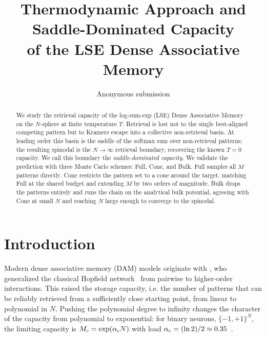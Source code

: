 \documentclass[letterpaper]{article} %
\title{\bfseries Thermodynamic Approach and Saddle-Dominated Capacity
\\of the LSE Dense Associative Memory}
\author{Anonymous submission}
\begin{document}
\maketitle

\begin{abstract}
We study the retrieval capacity of the log-sum-exp (LSE) Dense Associative Memory on the $N$-sphere at finite temperature $T$. Retrieval is lost not to the single best-aligned competing pattern but to Kramers escape into a collective non-retrieval basin. At leading order this basin is the saddle of the softmax sum over non-retrieval patterns; the resulting spinodal is the $N \to \infty$ retrieval boundary, recovering the known $T = 0$ capacity. We call this boundary the \textit{saddle-dominated capacity}. We validate the prediction with three Monte Carlo schemes: Full, Cone, and Bulk. Full samples all $M$ patterns directly. Cone restricts the pattern set to a cone around the target, matching Full at the shared budget and extending $M$ by two orders of magnitude. Bulk drops the patterns entirely and runs the chain on the analytical bulk potential, agreeing with Cone at small $N$ and reaching $N$ large enough to converge to the spinodal. %
\end{abstract}






\section{Introduction}

Modern dense associative memory (DAM) models originate with \citet{krotov2016dense}, who generalized the classical Hopfield network~\citep{Hopfield1982} from pairwise to higher-order interactions. This raised the storage capacity, i.e. the number of patterns that can be reliably retrieved from a sufficiently close starting point, from linear to polynomial in $N$. Pushing the polynomial degree to infinity changes the character of the capacity from polynomial to exponential: for binary neurons, $\{-1,+1\}^{N}$, the limiting capacity is $M_{\rm c} = \exp(\alpha_{\rm c} N)$ with load $\alpha_{\rm c} = (\ln 2)/2 \approx 0.35$~\citep{demircigil2017model}.
\end{document}
